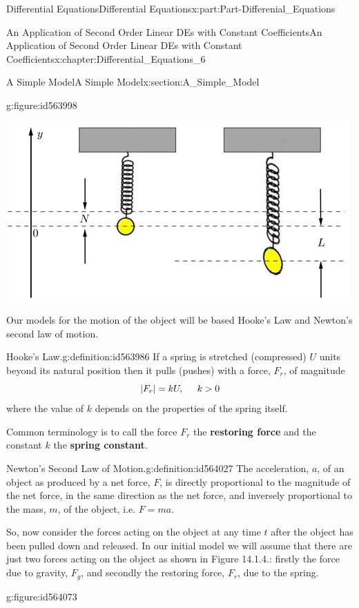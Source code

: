 \documentclass[oneside,10pt,]{book}
\newcommand{\terminology}[1]{\textbf{#1}}
\numberwithin{equation}{section}
\begin{document}
\begin{partptx}{Differential Equations}{}{Differential Equations}{}{}{x:part:Part-Differenial_Equations}
\begin{chapterptx}{An Application of Second Order Linear DEs with Constant Coefficients}{}{An Application of Second Order Linear DEs with Constant Coefficients}{}{}{x:chapter:Differential_Equations_6}
\begin{sectionptx}{A Simple Model}{}{A Simple Model}{}{}{x:section:A_Simple_Model}
\begin{figureptx}{}{g:figure:id563998}{}
\begin{image}{0.125}{0.75}{0.125}
\includegraphics[width=\linewidth]{./DifferentialEquations/Images/6/figure_1.png}
\end{image}%
\tcblower
\end{figureptx}%
 Our models for the motion of the object will be based Hooke’s Law and Newton’s second law of motion.%
\begin{definition}{Hooke's Law.}{g:definition:id563986}%
If a spring is stretched (compressed) \(U\) units beyond its natural position then it pulls (pushes) with a force, \terminology{\(F_r\)}, of magnitude \terminology{%
\begin{equation*}
\vert F_r\vert =kU, \hspace{5mm} k>0
\end{equation*}
} where the value of \(k\) depends on the properties of the spring itself.%
\end{definition}
Common terminology is to call the force \terminology{\(F_r\)} the \terminology{restoring force} and the constant \(k\) the \terminology{spring constant}.%
\begin{definition}{Newton's Second Law of Motion.}{g:definition:id564027}%
The acceleration, \terminology{\(a\)}, of an object as produced by a net force, \terminology{\(F\)},  is directly proportional to the magnitude of the net force, in the same direction as the net force, and inversely proportional to the mass, \(m\), of the object, i.e. \terminology{\(F=ma\)}.%
\end{definition}
So, now consider the forces acting on the object at any time \(t\) after the object has been pulled down and released. In our initial model we will assume that there are just two forces acting on the object as shown in Figure 14.1.4.: firstly the force due to gravity, \terminology{\(F_g\)}, and secondly the restoring force, \terminology{\(F_r\)}, due to the spring. \begin{figureptx}{}{g:figure:id564073}{}%

\end{figureptx}
\end{sectionptx}
\end{chapterptx}
\end{partptx}
\end{document}
